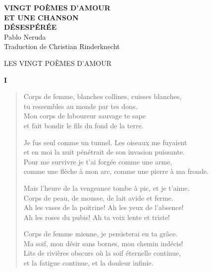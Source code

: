 \documentclass[11pt,a4paper]{book}
\begin{document}
\thispagestyle{empty}
\vspace*{70mm}
\begin{center}
  \textbf{\Huge VINGT POÈMES D'AMOUR \\
    ET UNE CHANSON \\
    DÉSESPÉRÉE} \\
\vspace*{10mm}
{\LARGE Pablo Neruda} \\
\vspace*{10mm}
Traduction de Christian Rinderknecht \\
\date{Noël 1996}
\end{center}

\cleardoublepage

\thispagestyle{empty}

\vspace*{80mm}
\begin{center}
{\huge LES VINGT POÈMES D'AMOUR}
\end{center}

\cleardoublepage



\begin{center} \textbf{I} \end{center}

\bigskip

\begin{verse}
  Corps de femme, blanches collines, cuisses blanches, \\
  tu ressembles au monde par tes dons.\\
  Mon corps de laboureur sauvage te sape \\
  et fait bondir le fils du fond de la terre.

  Je fus seul comme un tunnel. Les oiseaux me fuyaient \\
  et en moi la nuit pénétrait de son invasion puissante. \\
  Pour me survivre je t'ai forgée comme une arme, \\
  comme une flèche à mon arc, comme une pierre à ma fronde.

  Mais l'heure de la vengeance tombe à pic, et je t'aime. \\
  Corps de peau, de mousse, de lait avide et ferme. \\
  Ah les vases de la poitrine! Ah les yeux de l'absence! \\
  Ah les roses du pubis! Ah ta voix lente et triste!

  Corps de femme mienne, je persisterai en ta grâce. \\
  Ma soif, mon désir sans bornes, mon chemin indécis! \\
  Lits de rivières obscurs où la soif éternelle continue, \\
  et la fatigue continue, et la douleur infinie.
\end{verse}
\end{document}
